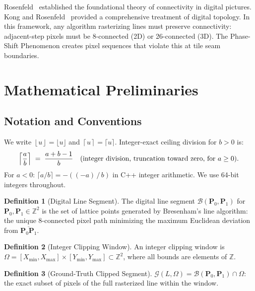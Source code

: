 \documentclass[12pt,a4paper]{article}
\theoremstyle{definition}
\newtheorem{definition}{Definition}[section]
\newcommand{\Z}{\mathbb{Z}}
\newcommand{\Zt}{\mathbb{Z}^2}
\newcommand{\Bresen}{\mathcal{B}}
\newcommand{\lfl}{\left\lfloor}
\newcommand{\rfl}{\right\rfloor}
\newcommand{\lce}{\left\lceil}
\newcommand{\rce}{\right\rceil}
\begin{document}
Rosenfeld~\cite{rosenfeld1970connectivity} established the
foundational theory of connectivity in digital pictures.
Kong and Rosenfeld~\cite{kong1989digital} provided a
comprehensive treatment of digital topology. In this
framework, any algorithm rasterizing lines must preserve
connectivity: adjacent-step pixels must be 8-connected (2D)
or 26-connected (3D). The Phase-Shift Phenomenon creates
pixel sequences that violate this at tile seam boundaries.

\section{Mathematical Preliminaries}
\label{sec:prelim}

\subsection{Notation and Conventions}

We write $\lfl u \rfl = \lfloor u \rfloor$ and
$\lce u \rce = \lceil u \rceil$.  Integer-exact ceiling
division for $b > 0$ is:
\[
  \Bigl\lceil \frac{a}{b} \Bigr\rceil \;=\;
  \frac{a + b - 1}{b} \quad\text{(integer division,
  truncation toward zero, for } a \ge 0\text{)}.
\]
For $a < 0$: $\lceil a/b \rceil = -((-a) \,/\, b)$ in
C++ integer arithmetic. We use 64-bit integers throughout.

\begin{definition}[Digital Line Segment]
The digital line segment $\Bresen(\mathbf{P}_0,
\mathbf{P}_1)$ for $\mathbf{P}_0, \mathbf{P}_1 \in \Zt$
is the set of lattice points generated by Bresenham's line
algorithm: the unique 8-connected pixel path minimizing the
maximum Euclidean deviation from
$\overline{\mathbf{P}_0\mathbf{P}_1}$.
\end{definition}

\begin{definition}[Integer Clipping Window]
An integer clipping window is $\Omega = [X_{\min},
X_{\max}] \times [Y_{\min}, Y_{\max}] \subset \Zt$,
where all bounds are elements of $\Z$.
\end{definition}

\begin{definition}[Ground-Truth Clipped Segment]
$\mathcal{G}(L, \Omega) = \Bresen(\mathbf{P}_0,
\mathbf{P}_1) \cap \Omega$: the exact subset of pixels
of the full rasterized line within the window.
\end{definition}
\end{document}
